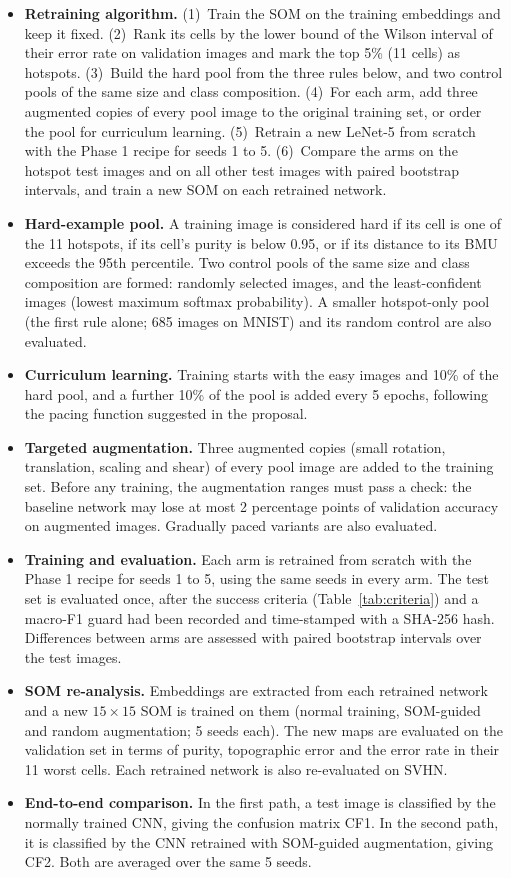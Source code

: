 \documentclass{scrartcl}
\begin{document}
\begin{itemize}
  \item \textbf{Retraining algorithm.} (1)~Train the SOM on the training embeddings and keep it fixed. (2)~Rank its cells by the lower bound of the Wilson interval of their error rate on validation images and mark the top 5\% (11 cells) as hotspots. (3)~Build the hard pool from the three rules below, and two control pools of the same size and class composition. (4)~For each arm, add three augmented copies of every pool image to the original training set, or order the pool for curriculum learning. (5)~Retrain a new LeNet-5 from scratch with the Phase 1 recipe for seeds 1 to 5. (6)~Compare the arms on the hotspot test images and on all other test images with paired bootstrap intervals, and train a new SOM on each retrained network.
  \item \textbf{Hard-example pool.} A training image is considered hard if its cell is one of the 11 hotspots, if its cell's purity is below 0.95, or if its distance to its BMU exceeds the 95th percentile. Two control pools of the same size and class composition are formed: randomly selected images, and the least-confident images (lowest maximum softmax probability). A smaller hotspot-only pool (the first rule alone; 685 images on MNIST) and its random control are also evaluated.
  \item \textbf{Curriculum learning.} Training starts with the easy images and 10\% of the hard pool, and a further 10\% of the pool is added every 5 epochs, following the pacing function suggested in the proposal.
  \item \textbf{Targeted augmentation.} Three augmented copies (small rotation, translation, scaling and shear) of every pool image are added to the training set. Before any training, the augmentation ranges must pass a check: the baseline network may lose at most 2 percentage points of validation accuracy on augmented images. Gradually paced variants are also evaluated.
  \item \textbf{Training and evaluation.} Each arm is retrained from scratch with the Phase 1 recipe for seeds 1 to 5, using the same seeds in every arm. The test set is evaluated once, after the success criteria (Table~\ref{tab:criteria}) and a macro-F1 guard had been recorded and time-stamped with a SHA-256 hash. Differences between arms are assessed with paired bootstrap intervals over the test images.
  \item \textbf{SOM re-analysis.} Embeddings are extracted from each retrained network and a new $15\times15$ SOM is trained on them (normal training, SOM-guided and random augmentation; 5 seeds each). The new maps are evaluated on the validation set in terms of purity, topographic error and the error rate in their 11 worst cells. Each retrained network is also re-evaluated on SVHN.
  \item \textbf{End-to-end comparison.} In the first path, a test image is classified by the normally trained CNN, giving the confusion matrix CF1. In the second path, it is classified by the CNN retrained with SOM-guided augmentation, giving CF2. Both are averaged over the same 5 seeds.
\end{itemize}
\end{document}
